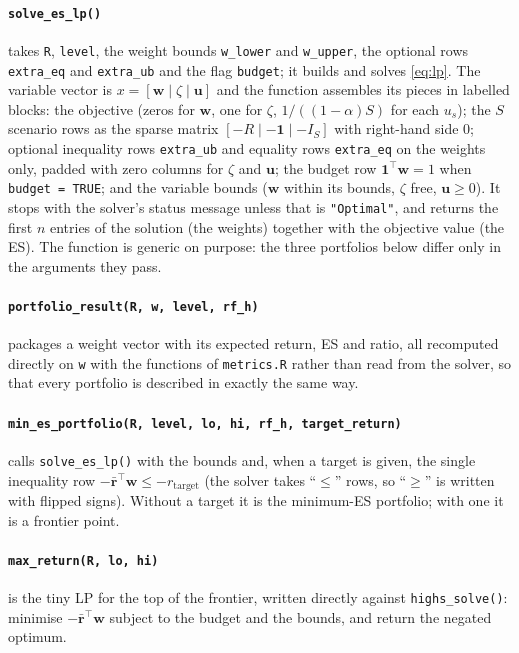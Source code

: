 \documentclass[11pt,a4paper]{article}
\newcommand{\w}{\mathbf{w}}
\newcommand{\rr}{\mathbf{r}}
\newcommand{\ones}{\mathbf{1}}
\newcommand{\code}[1]{\texttt{#1}}
\newcommand{\file}[1]{\texttt{#1}}
\theoremstyle{plain}
\theoremstyle{remark}
\begin{document}
\paragraph{\code{solve\_es\_lp()}} takes \code{R}, \code{level}, the weight bounds \code{w\_lower} and \code{w\_upper}, the optional rows \code{extra\_eq} and \code{extra\_ub} and the flag \code{budget}; it builds and solves \eqref{eq:lp}. The variable vector is
$x = [\w \mid \zeta \mid \mathbf u]$ and the function assembles its pieces
in labelled blocks: the objective (zeros for $\w$, one for $\zeta$,
$1/((1-\alpha)S)$ for each $u_s$); the $S$ scenario rows as the sparse
matrix $[-R \mid -\ones \mid -I_S]$ with right-hand side $0$; optional
inequality rows \code{extra\_ub} and equality rows \code{extra\_eq} on the
weights only, padded with zero columns for $\zeta$ and $\mathbf u$; the
budget row $\ones^\top\w = 1$ when \code{budget = TRUE}; and the variable
bounds ($\w$ within its bounds, $\zeta$ free, $\mathbf u \ge 0$). It stops
with the solver's status message unless that is \code{"Optimal"}, and
returns the first $n$ entries of the solution (the weights) together with
the objective value (the ES). The function is generic on purpose: the
three portfolios below differ only in the arguments they pass.

\paragraph{\code{portfolio\_result(R, w, level, rf\_h)}} packages a weight
vector with its expected return, ES and ratio, all recomputed directly on
\code{w} with the functions of \file{metrics.R} rather than read from the
solver, so that every portfolio is described in exactly the same way.

\paragraph{\code{min\_es\_portfolio(R, level, lo, hi, rf\_h, target\_return)}}
calls \code{solve\_es\_lp()} with the bounds and, when a target is given, the
single inequality row $-\bar{\rr}^\top\w \le -r_{\mathrm{target}}$ (the
solver takes ``$\le$'' rows, so ``$\ge$'' is written with flipped signs).
Without a target it is the minimum-ES portfolio; with one it is a frontier
point.

\paragraph{\code{max\_return(R, lo, hi)}} is the tiny LP for the top of the
frontier, written directly against \code{highs\_solve()}: minimise
$-\bar{\rr}^\top\w$ subject to the budget and the bounds, and return the
negated optimum.
\end{document}
